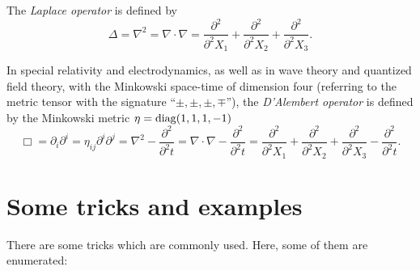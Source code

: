 The {\em Laplace operator}
is defined by
\begin{equation}
\Delta = \nabla^2= \nabla \cdot \nabla =
\frac{\partial^2 }{\partial^2 X_1}+
\frac{\partial^2 }{\partial^2 X_2}+
\frac{\partial^2 }{\partial^2 X_3}
.
\end{equation}

In special relativity and electrodynamics,  as well as in  wave theory and quantized field theory, with the Minkowski space-time
of dimension four
(referring to the metric tensor with the signature ``$\pm ,\pm ,\pm ,\mp$''),
the {\em D'Alembert operator}
is defined by the Minkowski metric $\eta = {\rm diag} (1,1,1,-1)$
\begin{equation}
\Box  = \partial_i \partial^i
=
\eta_{ij}  \partial^i \partial^j=
\nabla^2- \frac{\partial^2 }{\partial^2 t}=
\nabla \cdot \nabla - \frac{\partial^2 }{\partial^2 t}=
\frac{\partial^2 }{\partial^2 X_1}+
\frac{\partial^2 }{\partial^2 X_2}+
\frac{\partial^2 }{\partial^2 X_3}- \frac{\partial^2 }{\partial^2 t}
.
\end{equation}



\section{Some tricks and examples}

There are some tricks which are commonly used.
Here, some of them are enumerated:

